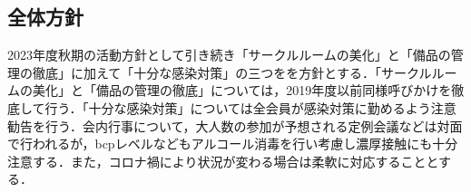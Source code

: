 \subsection*{全体方針}

2023年度秋期の活動方針として引き続き「サークルルームの美化」と「備品の管理の徹底」に加えて「十分な感染対策」の三つをを方針とする．「サークルルームの美化」と「備品の管理の徹底」については，2019年度以前同様呼びかけを徹底して行う．「十分な感染対策」については全会員が感染対策に勤めるよう注意勧告を行う．会内行事について，大人数の参加が予想される定例会議などは対面で行われるが，bcpレベルなどもアルコール消毒を行い考慮し濃厚接触にも十分注意する．また，コロナ禍により状況が変わる場合は柔軟に対応することとする．


